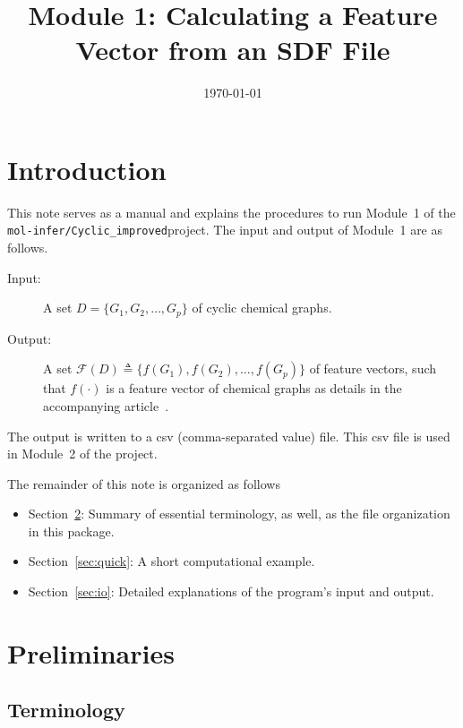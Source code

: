 \documentclass[11pt, titlepage, dvipdfmx, twoside]{article}
\title{\huge Module 1: Calculating a Feature Vector from an SDF File}
\author{\project}
\newcommand{\project}{{\tt mol-infer/Cyclic\_improved}}
\newcommand{\secref}[1]{Section~\ref{sec:#1}}
\begin{document}
\makeatletter 
\let\c@lstlisting\c@figure
\makeatother
\date{\today}
\maketitle
\thispagestyle{empty}
\tableofcontents
\clearpage
{}


\section{Introduction}
This note serves as a manual and
explains the procedures to run Module~1 of the \project project.
The input and output of Module~1 are as follows.

\begin{oframed}
\begin{description}
\item[Input:] 
A set $D=\{G_1, G_2, \dots, G_p\}$ of cyclic chemical graphs. 
%
\item[Output:] 
A set ${\mathcal F}(D)\triangleq\{f(G_1), f(G_2), \dots, f(G_p)\}$
of feature vectors, such that $f(\cdot)$ is a feature vector of
chemical graphs as details in the accompanying article~\cite{BH_cyclic_arxiv}.
%
\end{description}
\end{oframed}
%
The output is written to a csv (comma-separated value) file.
This csv file is used in Module~2 of the project.


The remainder of this note is organized as follows
\begin{itemize}
\item \secref{preparation}: 
Summary of essential terminology, as well, as the file organization
in this package.

\item \secref{quick}: 
A short computational example.

\item \secref{io}: 
Detailed explanations of the program's input and output.
\end{itemize}

\clearpage
\section{Preliminaries}
\label{sec:preparation}

\subsection{Terminology}
\end{document}

